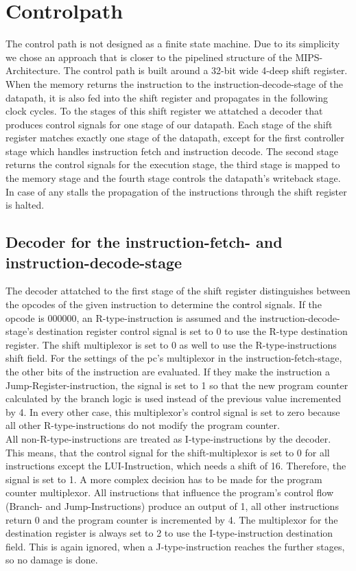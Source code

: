 \section{Controlpath}
The control path is not designed as a finite state machine. Due to its simplicity we chose an approach that is closer to the pipelined structure of the MIPS-Architecture. The control path is built around a 32-bit wide 4-deep shift register. When the memory returns the instruction to the instruction-decode-stage of the datapath, it is also fed into the shift register and propagates in the following clock cycles. To the stages of this shift register we attatched a decoder that produces control signals for one stage of our datapath. Each stage of the shift register matches exactly one stage of the datapath, except for the first controller stage which handles instruction fetch and instruction decode. The second stage returns the control signals for the execution stage, the third stage is mapped to the memory stage and the fourth stage controls the datapath's writeback stage. In case of any stalls the propagation of the instructions through the shift register is halted.
\subsection{Decoder for the instruction-fetch- and instruction-decode-stage}
The decoder attatched to the first stage of the shift register distinguishes between the opcodes of the given instruction to determine the control signals. If the opcode is 000000, an R-type-instruction is assumed and the instruction-decode-stage's destination register control signal is set to 0 to use the R-type destination register. The shift multiplexor is set to 0 as well to use the R-type-instructions shift field. For the settings of the pc's multiplexor in the instruction-fetch-stage, the other bits of the instruction are evaluated. If they make the instruction a Jump-Register-instruction, the signal is set to 1 so that the new program counter calculated by the branch logic is used instead of the previous value incremented by 4. In every other case, this multiplexor's control signal is set to zero because all other R-type-instructions do not modify the program counter.\\
All non-R-type-instructions are treated as I-type-instructions by the decoder. This means, that the control signal for the shift-multiplexor is set to 0 for all instructions except the LUI-Instruction, which needs a shift of 16. Therefore, the signal is set to 1. A more complex decision has to be made for the program counter multiplexor. All instructions that influence the program's control flow (Branch- and Jump-Instructions) produce an output of 1, all other instructions return 0 and the program counter is incremented by 4. The multiplexor for the destination register is always set to 2 to use the I-type-instruction destination field. This is again ignored, when a J-type-instruction reaches the further stages, so no damage is done.
